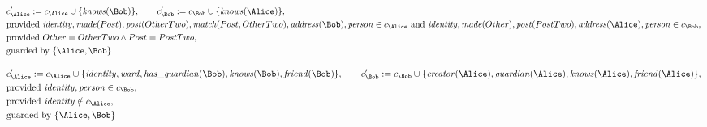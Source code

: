 \begin{align*}
&
c'_
{
\Alice
}
 := 
c_
{
\Alice
}
 \cup 
\{
\mathit{\detokenize{
knows
}}
(
\Bob
)
\}
, \qquad 
c'_
{
\Bob
}
 := 
c_
{
\Bob
}
 \cup 
\{
\mathit{\detokenize{
knows
}}
(
\Alice
)
\}
,\\
&
\text{provided } 
\mathit{\detokenize{
identity
}}
,
\mathit{\detokenize{
made
}}
(
Post
)
,
\mathit{\detokenize{
post
}}
(
OtherTwo
)
,
\mathit{\detokenize{
match
}}
(
Post
,
OtherTwo
)
,
\mathit{\detokenize{
address
}}
(
\Bob
)
,
\mathit{\detokenize{
person
}}
 \in c_
{
\Alice
}
 \text{ and } 
\mathit{\detokenize{
identity
}}
,
\mathit{\detokenize{
made
}}
(
Other
)
,
\mathit{\detokenize{
post
}}
(
PostTwo
)
,
\mathit{\detokenize{
address
}}
(
\Alice
)
,
\mathit{\detokenize{
person
}}
 \in c_
{
\Bob
}
,\\
&
\text{provided } 
Other
=
OtherTwo
\land
Post
=
PostTwo
,\\
&
\text{guarded by } \{
\Alice
,
\Bob
\}
\end{align*}

\begin{align*}
&
c'_
{
\Alice
}
 := 
c_
{
\Alice
}
 \cup 
\{
\mathit{\detokenize{
identity
}}
,
\mathit{\detokenize{
ward
}}
,
\mathit{\detokenize{
has_guardian
}}
(
\Bob
)
,
\mathit{\detokenize{
knows
}}
(
\Bob
)
,
\mathit{\detokenize{
friend
}}
(
\Bob
)
\}
, \qquad 
c'_
{
\Bob
}
 := 
c_
{
\Bob
}
 \cup 
\{
\mathit{\detokenize{
creator
}}
(
\Alice
)
,
\mathit{\detokenize{
guardian
}}
(
\Alice
)
,
\mathit{\detokenize{
knows
}}
(
\Alice
)
,
\mathit{\detokenize{
friend
}}
(
\Alice
)
\}
,\\
&
\text{provided } 
\mathit{\detokenize{
identity
}}
,
\mathit{\detokenize{
person
}}
 \in c_
{
\Bob
}
,\\
&
\text{provided } 
\mathit{\detokenize{
identity
}}
 \notin c_
{
\Alice
}
,\\
&
\text{guarded by } \{
\Alice
,
\Bob
\}
\end{align*}

